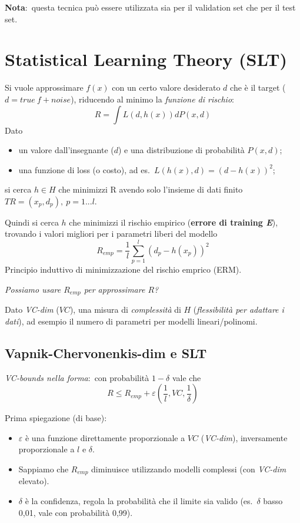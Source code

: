 \noindent\textbf{Nota}:\ questa tecnica può essere utilizzata sia per il validation set che per il test set.\

\section{Statistical Learning Theory (SLT)}

Si vuole approssimare $f(x)$ con un certo valore desiderato $d$ che è il target ($d = \mathit{true}\ f+ \mathit{noise}$), riducendo al minimo la \textit{funzione di rischio}:
\[R = \int L (d, h (x)) dP (x, d)\]
\noindent Dato
\begin{itemize}
	\item un valore dall'insegnante ($d$) e una distribuzione di probabilità $P (x, d)$;
	\item una funzione di loss (o costo), ad es.\ $L (h (x), d) = (d - h (x))^2$;
\end{itemize}

\noindent si cerca $h \in H$ che minimizzi R avendo solo l'insieme di dati finito $TR = (x_p, d_p),\ p = 1.. . l $.\

\vspace{12pt}
\noindent Quindi si cerca $h$ che minimizzi il rischio empirico (\textbf{errore di training \textit{E}}), trovando i valori migliori per i parametri liberi del modello
\[R_{emp} = \frac{1}{l} \sum_{p=1}^l(d_p - h (x_p))^2\]
Principio induttivo di minimizzazione del rischio emprico (ERM).\

\begin{center}
	\textit{Possiamo usare $R_{emp}$ per approssimare $R$?}
\end{center}

\noindent Dato \textit{VC-dim} ($VC$), una misura di \textit{complessità} di $H$ (\textit{flessibilità per adattare i dati}), ad esempio il numero di parametri per modelli lineari/polinomi.\

\subsection{Vapnik-Chervonenkis-dim e SLT}

\textit{VC-bounds nella forma}:\ con probabilità $1-\delta$ vale che
\[R \leq R_{emp} + \varepsilon \left(\frac{1}{l}, \mathit{VC}, \frac{1}{\delta}\right)\]

\noindent Prima spiegazione (di base):

\begin{itemize}
	\item $\varepsilon$ è una funzione direttamente proporzionale a $\mathit{VC}$ (\textit{VC-dim}), inversamente proporzionale a $l$ e $\delta$.
	\item Sappiamo che $R_{emp}$ diminuisce utilizzando modelli complessi (con \textit{VC-dim} elevato).
	\item $\delta$ è la confidenza, regola la probabilità che il limite sia valido (es.\ $\delta$ basso 0,01, vale con probabilità 0,99).
\end{itemize}

